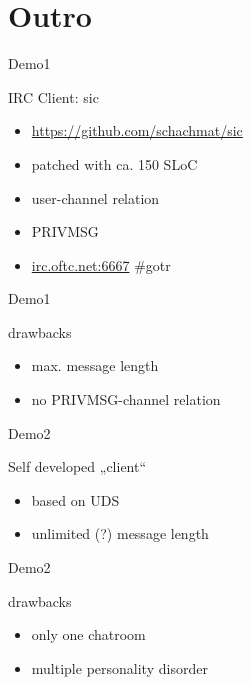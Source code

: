 \section{Outro}

\begin{frame}{Demo1}
	\begin{block}{IRC Client: sic}
		\begin{itemize}
			\item \url{https://github.com/schachmat/sic}
			\item patched with ca. 150 SLoC
			\item user-channel relation
			\item PRIVMSG
			\item \url{irc.oftc.net:6667} \#gotr
		\end{itemize}
	\end{block}
\end{frame}

\begin{frame}{Demo1}
	\begin{alertblock}{drawbacks}
		\begin{itemize}
			\item max. message length
			\item no PRIVMSG-channel relation
		\end{itemize}
	\end{alertblock}
\end{frame}

\begin{frame}{Demo2}
	\begin{block}{Self developed „client“}
		\begin{itemize}
			\item based on UDS
			\item unlimited (?) message length
		\end{itemize}
	\end{block}
\end{frame}

\begin{frame}{Demo2}
	\begin{alertblock}{drawbacks}
		\begin{itemize}
			\item only one chatroom
			\item multiple personality disorder
		\end{itemize}
	\end{alertblock}
\end{frame}

